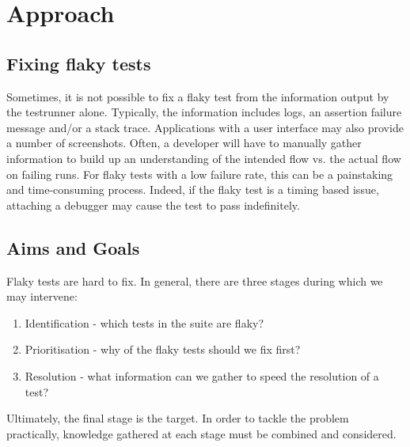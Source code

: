 \section{Approach}
\label{sec:approach}


\subsection{Fixing flaky tests}


Sometimes, it is not possible to fix a flaky test from the information output by the testrunner alone. Typically, the information includes logs, an assertion failure message and/or a stack trace. Applications with a user interface may also provide a number of screenshots. Often, a developer will have to manually gather information to build up an understanding of the intended flow vs. the actual flow on failing runs. For flaky tests with a low failure rate, this can be a painstaking and time-consuming process. Indeed, if the flaky test is a timing based issue, attaching a debugger may cause the test to pass indefinitely.



\subsection{Aims and Goals}

Flaky tests are hard to fix. In general, there are three stages during which we may intervene:
\begin{enumerate}
	\item Identification - which tests in the suite are flaky?
	\item Prioritisation - why of the flaky tests should we fix first?
	\item Resolution - what information can we gather to speed the resolution of a test?
\end{enumerate}

Ultimately, the final stage is the target. In order to tackle the problem practically, knowledge gathered at each stage must be combined and considered.

